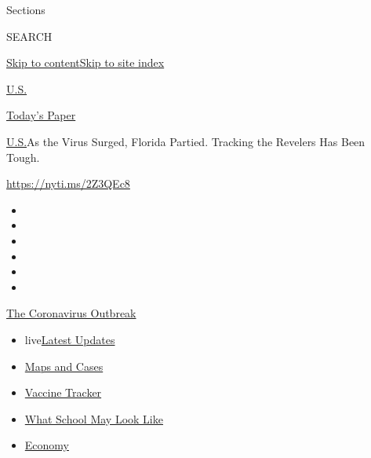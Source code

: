 Sections

SEARCH

\protect\hyperlink{site-content}{Skip to
content}\protect\hyperlink{site-index}{Skip to site index}

\href{https://www.nytimes.com/section/us}{U.S.}

\href{https://myaccount.nytimes.com/auth/login?response_type=cookie\&client_id=vi}{}

\href{https://www.nytimes.com/section/todayspaper}{Today's Paper}

\href{/section/us}{U.S.}\textbar{}As the Virus Surged, Florida Partied.
Tracking the Revelers Has Been Tough.

\url{https://nyti.ms/2Z3QEc8}

\begin{itemize}
\item
\item
\item
\item
\item
\item
\end{itemize}

\href{https://www.nytimes.com/news-event/coronavirus?action=click\&pgtype=Article\&state=default\&region=TOP_BANNER\&context=storylines_menu}{The
Coronavirus Outbreak}

\begin{itemize}
\tightlist
\item
  live\href{https://www.nytimes.com/2020/08/01/world/coronavirus-covid-19.html?action=click\&pgtype=Article\&state=default\&region=TOP_BANNER\&context=storylines_menu}{Latest
  Updates}
\item
  \href{https://www.nytimes.com/interactive/2020/us/coronavirus-us-cases.html?action=click\&pgtype=Article\&state=default\&region=TOP_BANNER\&context=storylines_menu}{Maps
  and Cases}
\item
  \href{https://www.nytimes.com/interactive/2020/science/coronavirus-vaccine-tracker.html?action=click\&pgtype=Article\&state=default\&region=TOP_BANNER\&context=storylines_menu}{Vaccine
  Tracker}
\item
  \href{https://www.nytimes.com/interactive/2020/07/29/us/schools-reopening-coronavirus.html?action=click\&pgtype=Article\&state=default\&region=TOP_BANNER\&context=storylines_menu}{What
  School May Look Like}
\item
  \href{https://www.nytimes.com/live/2020/07/31/business/stock-market-today-coronavirus?action=click\&pgtype=Article\&state=default\&region=TOP_BANNER\&context=storylines_menu}{Economy}
\end{itemize}

